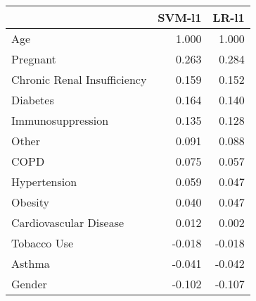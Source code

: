 \begin{tabular}{lrr}
\toprule
{} &  SVM-l1 &  LR-l1 \\
\midrule
Age                         &   1.000 &  1.000 \\
Pregnant                    &   0.263 &  0.284 \\
Chronic Renal Insufficiency &   0.159 &  0.152 \\
Diabetes                    &   0.164 &  0.140 \\
Immunosuppression           &   0.135 &  0.128 \\
Other                       &   0.091 &  0.088 \\
COPD                        &   0.075 &  0.057 \\
Hypertension                &   0.059 &  0.047 \\
Obesity                     &   0.040 &  0.047 \\
Cardiovascular Disease      &   0.012 &  0.002 \\
Tobacco Use                 &  -0.018 & -0.018 \\
Asthma                      &  -0.041 & -0.042 \\
Gender                      &  -0.102 & -0.107 \\
\bottomrule
\end{tabular}

